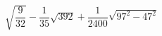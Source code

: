 \begin{ex}[type=calculate]
	\begin{condition}
		\( \sqrt{\dfrac{9}{32}}-\dfrac{1}{35}\sqrt{392}+\dfrac{1}{2400}\sqrt{97^2-47^2} \)
	\end{condition}
\end{ex}